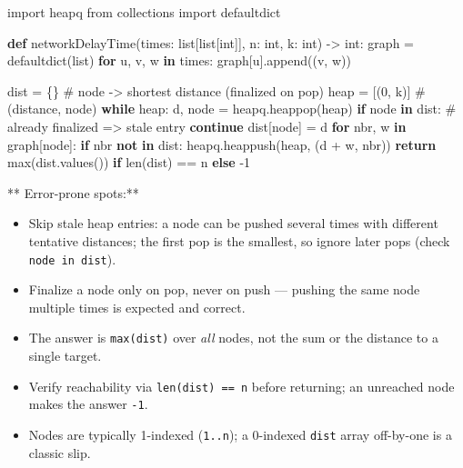 \documentclass[11pt]{article}
\providecommand{\tightlist}{\setlength{\itemsep}{1pt}\setlength{\parskip}{0pt}}
\newenvironment{Shaded}{\begin{snugshade}}{\end{snugshade}}
\newcommand{\BuiltInTok}[1]{\textcolor[rgb]{0.50,0.55,0.55}{#1}}
\newcommand{\CommentTok}[1]{\textcolor[rgb]{0.48,0.49,0.49}{#1}}
\newcommand{\ControlFlowTok}[1]{\textcolor[rgb]{0.99,0.74,0.29}{\textbf{#1}}}
\newcommand{\DecValTok}[1]{\textcolor[rgb]{0.96,0.45,0.00}{#1}}
\newcommand{\ImportTok}[1]{\textcolor[rgb]{0.15,0.68,0.38}{#1}}
\newcommand{\KeywordTok}[1]{\textcolor[rgb]{0.81,0.81,0.76}{\textbf{#1}}}
\newcommand{\NormalTok}[1]{\textcolor[rgb]{0.81,0.81,0.76}{#1}}
\newcommand{\OperatorTok}[1]{\textcolor[rgb]{0.81,0.81,0.76}{#1}}
\begin{document}
\begin{Shaded}
\begin{Highlighting}[]
\ImportTok{import}\NormalTok{ heapq}
\ImportTok{from}\NormalTok{ collections }\ImportTok{import}\NormalTok{ defaultdict}

\KeywordTok{def}\NormalTok{ networkDelayTime(times: }\BuiltInTok{list}\NormalTok{[}\BuiltInTok{list}\NormalTok{[}\BuiltInTok{int}\NormalTok{]], n: }\BuiltInTok{int}\NormalTok{, k: }\BuiltInTok{int}\NormalTok{) }\OperatorTok{{-}\textgreater{}} \BuiltInTok{int}\NormalTok{:}
\NormalTok{    graph }\OperatorTok{=}\NormalTok{ defaultdict(}\BuiltInTok{list}\NormalTok{)}
    \ControlFlowTok{for}\NormalTok{ u, v, w }\KeywordTok{in}\NormalTok{ times:}
\NormalTok{        graph[u].append((v, w))}

\NormalTok{    dist }\OperatorTok{=}\NormalTok{ \{\}                       }\CommentTok{\# node {-}\textgreater{} shortest distance (finalized on pop)}
\NormalTok{    heap }\OperatorTok{=}\NormalTok{ [(}\DecValTok{0}\NormalTok{, k)]                 }\CommentTok{\# (distance, node)}
    \ControlFlowTok{while}\NormalTok{ heap:}
\NormalTok{        d, node }\OperatorTok{=}\NormalTok{ heapq.heappop(heap)}
        \ControlFlowTok{if}\NormalTok{ node }\KeywordTok{in}\NormalTok{ dist:            }\CommentTok{\# already finalized =\textgreater{} stale entry}
            \ControlFlowTok{continue}
\NormalTok{        dist[node] }\OperatorTok{=}\NormalTok{ d}
        \ControlFlowTok{for}\NormalTok{ nbr, w }\KeywordTok{in}\NormalTok{ graph[node]:}
            \ControlFlowTok{if}\NormalTok{ nbr }\KeywordTok{not} \KeywordTok{in}\NormalTok{ dist:}
\NormalTok{                heapq.heappush(heap, (d }\OperatorTok{+}\NormalTok{ w, nbr))}
    \ControlFlowTok{return} \BuiltInTok{max}\NormalTok{(dist.values()) }\ControlFlowTok{if} \BuiltInTok{len}\NormalTok{(dist) }\OperatorTok{==}\NormalTok{ n }\ControlFlowTok{else} \OperatorTok{{-}}\DecValTok{1}
\end{Highlighting}
\end{Shaded}

** Error-prone spots:**

\begin{itemize}
\tightlist
\item
  Skip stale heap entries: a node can be pushed several times with different tentative distances; the first pop is the smallest, so ignore later pops (check \texttt{node\ in\ dist}).
\item
  Finalize a node only on pop, never on push --- pushing the same node multiple times is expected and correct.
\item
  The answer is \texttt{max(dist)} over \emph{all} nodes, not the sum or the distance to a single target.
\item
  Verify reachability via \texttt{len(dist)\ ==\ n} before returning; an unreached node makes the answer \texttt{-1}.
\item
  Nodes are typically 1-indexed (\texttt{1..n}); a 0-indexed \texttt{dist} array off-by-one is a classic slip.
\end{itemize}
\end{document}
